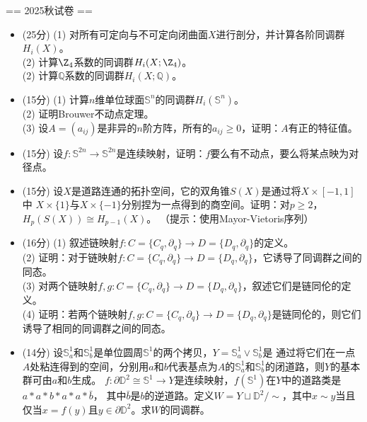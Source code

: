 
== 2025秋试卷 ==
\begin{itemize}
    \item[1.] (25分) (1) 对所有可定向与不可定向闭曲面$X$进行剖分，并计算各阶同调群$H_i(X)$。\\
    (2) 计算$\Z_4$系数的同调群$H_i(X;\Z_4)$。\\
    (2) 计算$\mathbb{Q}$系数的同调群$H_i(X;\mathbb{Q})$。\\
    \item[2.] (15分) (1) 计算$n$维单位球面$\mathbb{S}^n$的同调群$H_i(\mathbb{S}^n)$。\\
    (2) 证明Brouwer不动点定理。\\
    (3) 设$A=(a_{ij})$是非异的$n$阶方阵，所有的$a_{ij}\ge0$，证明：$A$有正的特征值。
    \item[3.] (15分) 设$f:\mathbb{S}^{2n}\to\mathbb{S}^{2n}$是连续映射，证明：$f$要么有不动点，要么将某点映为对径点。
    \item[4.] (15分) 设$X$是道路连通的拓扑空间，它的双角锥$S(X)$是通过将$X\times[-1,1]$中
    $X\times\{1\}$与$X\times\{-1\}$分别捏为一点得到的商空间。证明：对$p\geq2$，$H_p(S(X))\cong H_{p-1}(X)$。
    （提示：使用Mayor-Vietoris序列）
    \item[5.] (16分) (1) 叙述链映射$f:C=\{C_q,\partial_q\}\to D=\{D_q,\partial_q\}$的定义。\\
    (2) 证明：对于链映射$f:C=\{C_q,\partial_q\}\to D=\{D_q,\partial_q\}$，它诱导了同调群之间的同态。\\
    (3) 对两个链映射$f,g:C=\{C_q,\partial_q\}\to D=\{D_q,\partial_q\}$，叙述它们是链同伦的定义。\\
    (4) 证明：若两个链映射$f,g:C=\{C_q,\partial_q\}\to D=\{D_q,\partial_q\}$是链同伦的，则它们诱导了相同的同调群之间的同态。
    \item[6.] (14分) 设$\mathbb{S}_a^1$和$\mathbb{S}_b^1$是单位圆周$\mathbb{S}^1$的两个拷贝，$Y=\mathbb{S}_a^1\vee\mathbb{S}_b^1$是
    通过将它们在一点$A$处粘连得到的空间，分别用$a$和$b$代表基点为$A$的$\mathbb{S}_a^1$和$\mathbb{S}_b^1$的闭道路，则$Y$的基本群可由$a$和$b$生成。
    $f:\partial\mathbb{D}^2\cong\mathbb{S}^1\to Y$是连续映射，$f(\mathbb{S}^1)$在$Y$中的道路类是$a\ast a\ast b\ast a\ast a\ast\bar{b}$，
    其中$\bar{b}$是$b$的逆道路。定义$W=Y\sqcup \mathbb{D}^2/\sim$，其中$x\sim y$当且仅当$x=f(y)$且$y\in\partial\mathbb{D}^2$。求$W$的同调群。
\end{itemize}

